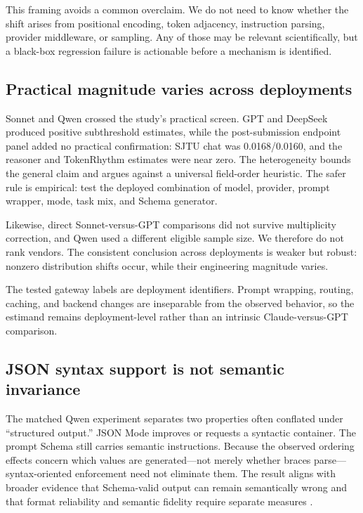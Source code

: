 \documentclass[11pt,a4paper]{article}
\begin{document}
This framing avoids a common overclaim. We do not need to know whether the shift arises from positional encoding, token adjacency, instruction parsing, provider middleware, or sampling. Any of those may be relevant scientifically, but a black-box regression failure is actionable before a mechanism is identified.

\subsection{Practical magnitude varies across deployments}
Sonnet and Qwen crossed the study's practical screen. GPT and DeepSeek produced positive subthreshold estimates, while the post-submission endpoint panel added no practical confirmation: SJTU chat was 0.0168/0.0160, and the reasoner and TokenRhythm estimates were near zero. The heterogeneity bounds the general claim and argues against a universal field-order heuristic. The safer rule is empirical: test the deployed combination of model, provider, prompt wrapper, mode, task mix, and Schema generator.

Likewise, direct Sonnet-versus-GPT comparisons did not survive multiplicity correction, and Qwen used a different eligible sample size. We therefore do not rank vendors. The consistent conclusion across deployments is weaker but robust: nonzero distribution shifts occur, while their engineering magnitude varies.

The tested gateway labels are deployment identifiers. Prompt wrapping, routing, caching, and backend changes are inseparable from the observed behavior, so the estimand remains deployment-level rather than an intrinsic Claude-versus-GPT comparison.

\subsection{JSON syntax support is not semantic invariance}
The matched Qwen experiment separates two properties often conflated under ``structured output.'' JSON Mode improves or requests a syntactic container. The prompt Schema still carries semantic instructions. Because the observed ordering effects concern which values are generated---not merely whether braces parse---syntax-oriented enforcement need not eliminate them. The result aligns with broader evidence that Schema-valid output can remain semantically wrong \citep{li2026orderbench} and that format reliability and semantic fidelity require separate measures \citep{hasan2026structhallu}.
\end{document}
